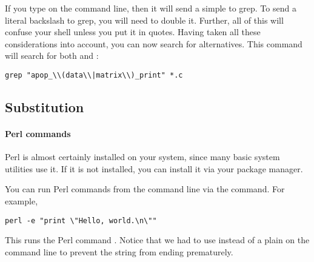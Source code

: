 If you type \ci{$\backslash$|} on the command line, then it will send a
simple \ci{|} to grep. To send a literal backslash to grep, you will
need to double it. Further, all of this will confuse your shell unless
you put it in quotes. Having taken all these considerations into
account, you can now search for alternatives. This command will search
for both  and :
\begin{lstlisting}
grep "apop_\\(data\\|matrix\\)_print" *.c
\end{lstlisting}

\subsection{Substitution} 

\paragraph{Perl commands} Perl is almost certainly installed on your
system, since many basic system utilities use it. If it is not
installed, you can install it via your package manager.

You can run Perl commands from the command line via the  command.
For example,
\begin{lstlisting}
perl -e "print \"Hello, world.\n\""
\end{lstlisting}
This runs the Perl command . Notice
that we had to use  instead of a plain  on the
command line to prevent the string from ending prematurely.

